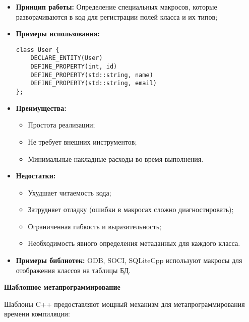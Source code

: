             \begin{itemize}
                \item \textbf{Принцип работы:} Определение специальных макросов, которые разворачиваются в код для регистрации полей класса и их типов;
                
                \item \textbf{Примеры использования:} 
                \begin{lstlisting}[style=cpp_style]
class User {
    DECLARE_ENTITY(User)
    DEFINE_PROPERTY(int, id)
    DEFINE_PROPERTY(std::string, name)
    DEFINE_PROPERTY(std::string, email)
};
                \end{lstlisting}
                
                \item \textbf{Преимущества:}
                \begin{itemize}
                    \item Простота реализации;
                    \item Не требует внешних инструментов;
                    \item Минимальные накладные расходы во время выполнения.
                \end{itemize}
                
                \item \textbf{Недостатки:}
                \begin{itemize}
                    \item Ухудшает читаемость кода;
                    \item Затрудняет отладку (ошибки в макросах сложно диагностировать);
                    \item Ограниченная гибкость и выразительность;
                    \item Необходимость явного определения метаданных для каждого класса.
                \end{itemize}
                
                \item \textbf{Примеры библиотек:} ODB, SOCI, SQLiteCpp используют макросы для отображения классов на таблицы БД.
            \end{itemize}

        \textbf{Шаблонное метапрограммирование}
        
            Шаблоны C++ предоставляют мощный механизм для метапрограммирования времени компиляции:
            
